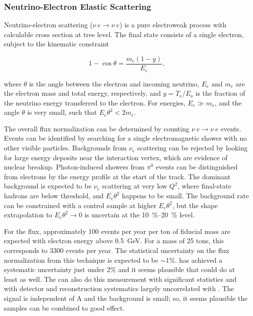 \subsubsection{Neutrino-Electron Elastic Scattering}
\label{sec:appx-nd:fluxintro-e-nu-scatt}



Neutrino-electron scattering ($\nu \ e \rightarrow \nu \ e$) is a pure electroweak process with calculable cross section at tree level. The final state consists of a single electron, subject to the kinematic constraint 

\begin{equation}
1 - \cos \theta = \frac{m_{e}(1-y)}{E_{e}},
\end{equation}

where $\theta$ is the angle between the electron and incoming neutrino, $E_{e}$ and $m_{e}$ are the electron mass and total energy, respectively, and $y = T_{e}/E_{\nu}$ is the fraction of the neutrino energy transferred to the electron. For  energies, $E_{e} \gg m_{e}$, and the angle $\theta$ is very small, such that $E_{e}\theta^{2} < 2m_{e}$. 

The overall flux normalization can be determined by counting $\nu \ e \rightarrow \nu \ e$ events. Events can be identified by searching for a single electromagnetic shower with no other visible particles. Backgrounds from $\nu_{e}$  scattering can be rejected by looking for large energy deposits near the interaction vertex, which are evidence of nuclear breakup. Photon-induced showers from  $\pi^{0}$ events can be distinguished from electrons by the energy profile at the start of the track. The dominant background is expected to be $\nu_{e}$  scattering at very low $Q^{2}$, where final-state hadrons are below threshold, and $E_{e}\theta^{2}$ happens to be small. The background rate can be constrained with a control sample at higher $E_{e}\theta^{2}$, but the shape extrapolation to $E_{e}\theta^{2} \rightarrow 0$ is uncertain at the \SIrange{10}{20}{\%} level.

For the  flux, approximately \num{100} events per year per ton of fiducial mass are expected with electron energy above \SI{0.5}{GeV}. For a  mass of 25 tons, this corresponds to \num{3300} events per year. The statistical uncertainty on the flux normalization from this technique is expected to be $\sim$1\%.  has achieved a systematic uncertainty just under 2\% and it seems plausible that \dune could do at least as well\cite{bib:minervanue}. The  can also do this measurement with significant statistics and with detector and reconstruction systematics largely uncorrelated with .  The signal is independent of A and the background is small; so, it seems plausible the samples can be combined to good effect.


